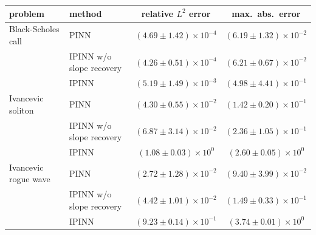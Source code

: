 \begin{tabular}{llcc}
\toprule
problem & method & relative $L^2$ error & max.\ abs.\ error \\
\midrule
Black-Scholes call & PINN & $(4.69 \pm 1.42) \times 10^{-4}$ & $(6.19 \pm 1.32) \times 10^{-2}$ \\
 & IPINN w/o slope recovery & $(4.26 \pm 0.51) \times 10^{-4}$ & $(6.21 \pm 0.67) \times 10^{-2}$ \\
 & IPINN & $(5.19 \pm 1.49) \times 10^{-3}$ & $(4.98 \pm 4.41) \times 10^{-1}$ \\
Ivancevic soliton & PINN & $(4.30 \pm 0.55) \times 10^{-2}$ & $(1.42 \pm 0.20) \times 10^{-1}$ \\
 & IPINN w/o slope recovery & $(6.87 \pm 3.14) \times 10^{-2}$ & $(2.36 \pm 1.05) \times 10^{-1}$ \\
 & IPINN & $(1.08 \pm 0.03) \times 10^{0}$ & $(2.60 \pm 0.05) \times 10^{0}$ \\
Ivancevic rogue wave & PINN & $(2.72 \pm 1.28) \times 10^{-2}$ & $(9.40 \pm 3.99) \times 10^{-2}$ \\
 & IPINN w/o slope recovery & $(4.42 \pm 1.01) \times 10^{-2}$ & $(1.49 \pm 0.33) \times 10^{-1}$ \\
 & IPINN & $(9.23 \pm 0.14) \times 10^{-1}$ & $(3.74 \pm 0.01) \times 10^{0}$ \\
\bottomrule
\end{tabular}
